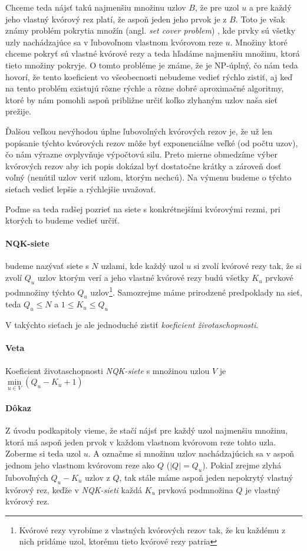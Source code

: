 Chceme teda nájsť takú najmenšiu množinu uzlov $B$, že pre uzol $u$ a pre každý
jeho vlastný kvórový rez platí, že aspoň jeden jeho prvok je z $B$.
Toto je však známy problém pokrytia množín (angl. \textit{set cover problem})
\cite{karp1972reducibilitysetcover},
kde prvky sú všetky uzly nachádzajúce sa v ľubovoľnom vlastnom kvórovom reze $u$.
Množiny ktoré chceme pokryť sú vlastné kvórové rezy
a teda hľadáme najmenšiu množinu, ktorá tieto množiny pokryje.
O tomto probléme je známe, že je NP-úplný, čo nám teda hovorí, že tento koeficient
vo všeobecnosti nebudeme vedieť rýchlo zistiť, aj keď na tento problém existujú
rôzne rýchle a rôzne dobré aproximačné algoritmy, ktoré by nám pomohli aspoň
približne určiť koľko zlyhaným uzlov naša sieť prežije.

Ďalšou veľkou nevýhodou úplne ľubovoľných kvórových rezov je,
že už len popísanie týchto kvórových rezov môže byť exponenciálne veľké (od počtu uzov),
čo nám výrazne ovplyvňuje výpočtovú silu. Preto mierne obmedzíme výber kvórových rezov
aby ich popis dokázal byť dostatočne krátky a zároveň dosť voľný (nenútil uzlov veriť
uzlom, ktorým nechcú). Na výmenu budeme o týchto sieťach vedieť lepšie a rýchlejšie
uvažovať.

Poďme sa teda radšej pozrieť na siete s konkrétnejšími kvórovými rezmi, pri ktorých
to budeme vedieť určiť.

\paragraph{NQK-siete} budeme nazývať siete s $N$ uzlami, kde každý uzol $u$ si
zvolí kvórové rezy tak, že si zvolí $Q_u$ uzlov ktorým verí a jeho vlastné kvórové rezy
budú všetky $K_u$ prvkové podmnožiny týchto $Q_u$ uzlov\footnote{Kvórové rezy
vyrobíme z vlastných kvórových rezov tak, že ku každému z nich pridáme uzol, ktorému
tieto kvórové rezy patria}.
Samozrejme máme prirodzené predpoklady na sieť, teda $Q_u \leq N$ a $1\leq K_u\leq Q_u$

\vspace{4mm}
V takýchto sieťach je ale jednoduché zistiť \textit{koeficient životaschopnosti}.

\paragraph{Veta}
Koeficient životaschopnosti \textit{NQK-siete} s množinou uzlou $V$ je
$\min\limits_{u\in V}(Q_u-K_u+1)$

\paragraph{Dôkaz}Z úvodu podkapitoly vieme, že stačí nájsť pre každý uzol
najmenšiu množinu, ktorá má aspoň jeden prvok v každom vlastnom kvórovom reze
tohto uzla.
Zoberme si teda uzol $u$. A označme si množinu uzlov nachádzajúcich sa v aspoň
jednom jeho vlastnom kvórovom reze ako $Q$ ($|Q|=Q_u$). Pokiaľ zrejme zlyhá
ľubovoľných $Q_u-K_u$ uzlov z $Q$, tak stále máme aspoň jeden nepokrytý
vlastný kvórový rez, keďže v \textit{NQK-sieti} každá $K_u$ prvková podmnožina
$Q$ je vlastný kvórový rez.

